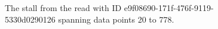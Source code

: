 \begin{figure}
\centering

\caption{\label{fig:stall}The stall from the read with ID e9f08690-171f-476f-9119-5330d0290126 spanning data points 20 to 778.}
\end{figure}
